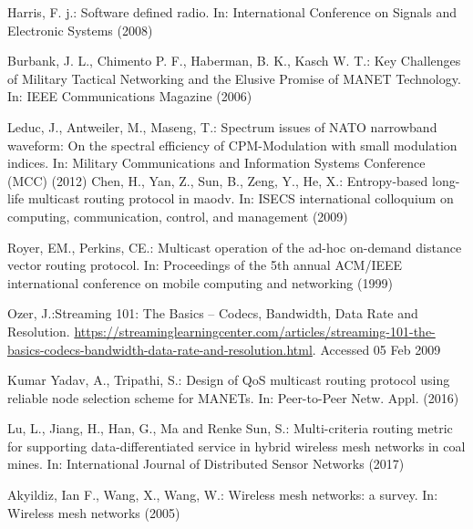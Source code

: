 \documentclass[runningheads]{llncs}
\begin{document}
%
%
%
%
\begin{thebibliography}{5}
%

Harris, F. j.: Software defined radio. In: International Conference on Signals and Electronic Systems (2008) 

Burbank, J. L., Chimento P. F., Haberman, B. K., Kasch W. T.: Key Challenges of Military Tactical Networking and the Elusive Promise of MANET Technology. In: IEEE Communications Magazine (2006)

Leduc, J., Antweiler, M., Maseng, T.: Spectrum issues of NATO narrowband waveform: On the spectral efficiency of CPM-Modulation with small modulation indices. In: Military Communications and Information Systems Conference (MCC) (2012)
Chen, H., Yan, Z., Sun, B., Zeng, Y., He, X.: Entropy-based long-life multicast routing protocol in maodv. In: ISECS international
colloquium on computing, communication, control, and
management (2009)

Royer, EM., Perkins, CE.: Multicast operation of the ad-hoc on-demand distance vector routing protocol. In: Proceedings of
the 5th annual ACM/IEEE international conference on mobile computing and networking (1999)


Ozer, J.:Streaming 101: The Basics – Codecs, Bandwidth, Data Rate and Resolution. \url{https://streaminglearningcenter.com/articles/streaming-101-the-basics-codecs-bandwidth-data-rate-and-resolution.html}. Accessed 05 Feb 2009

Kumar Yadav, A., Tripathi, S.: Design of QoS multicast routing protocol using reliable node selection scheme for MANETs. In: Peer-to-Peer Netw. Appl. (2016)

Lu, L., Jiang, H., Han, G., Ma and Renke Sun, S.: Multi-criteria routing metric for supporting data-differentiated service in hybrid wireless mesh networks in coal mines. In: International Journal of Distributed Sensor Networks (2017)

Akyildiz, Ian F., Wang, X., Wang, W.: Wireless mesh networks: a survey. In: Wireless mesh networks (2005)


\end{thebibliography}
\end{document}
